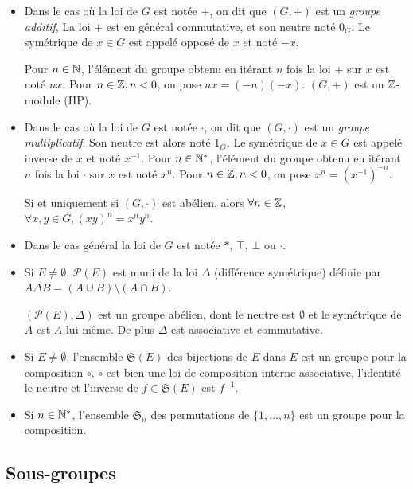 \begin{itemize}
    \item Dans le cas où la loi de $G$ est notée $+$, on dit que $(G, +)$ est un \emph{groupe additif},
    La loi $+$ est en général commutative, et son neutre noté $0_G$. Le symétrique de $x \in G$ 
    est appelé opposé de $x$ et noté $-x$.

    Pour $n \in \mathbb{N}$, l'élément du groupe obtenu en itérant $n$ fois la loi $+$ sur $x$ est noté
    $nx$. Pour $n \in \mathbb{Z}, n < 0$, on pose $nx = (-n)(-x)$. $(G, +)$ est un $\mathbb{Z}$-module (HP).
    \item Dans le cas où la loi de $G$ est notée $\cdot$, on dit que $(G, \cdot)$ est un \emph{groupe multiplicatif}.
    Son neutre est alors noté $1_G$. Le symétrique de $x \in G$ est appelé inverse de $x$ et noté $x^{-1}$.
    Pour $n \in \mathbb{N}^*$, l'élément du groupe obtenu en itérant $n$ fois la loi $\cdot$ sur $x$ est noté $x^n$. 
    Pour $n \in \mathbb{Z}, n < 0$, on pose $x^n = (x^{-1})^{-n}$.
    
    Si et uniquement si $(G, \cdot)$ est abélien, alors $\forall n \in \mathbb{Z}$, $\forall x, y \in G, (xy)^n = x^n y^n$.
    \item Dans le cas général la loi de $G$ est notée $\ast$, $\top$, $\bot$ ou $\cdot$. 

    \item Si $E \neq \emptyset$, $\mathscr P(E)$ est muni de la loi $\Delta$ (différence 
    symétrique) définie par $A \Delta B = (A \cup B) \setminus (A \cap B)$. 
    
    $(\mathscr P(E), \Delta)$ est un groupe abélien, dont le neutre est $\emptyset$ et
    le symétrique de $A$ est $A$ lui-même. De plus $\Delta$ est associative et commutative.

    \item Si $E \neq \emptyset$, l'ensemble $\mathfrak{S}(E)$ des bijections de $E$ dans $E$ est un groupe pour la composition $\circ$. 
    $\circ$ est bien une loi de composition interne associative, l'identité le neutre et l'inverse de $f \in \mathfrak{S}(E)$ est $f^{-1}$.

    \item Si $n \in \mathbb{N}^*$, l'ensemble $\mathfrak{S}_n$ des permutations de $\{1, \ldots, n\}$ est un groupe pour la composition.
\end{itemize}

\subsection{Sous-groupes}

